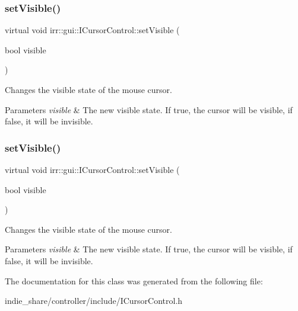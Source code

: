 \subsubsection{\texorpdfstring{set\+Visible()}{setVisible()}\hspace{0.1cm}{\footnotesize\ttfamily [1/2]}}
{\footnotesize\ttfamily virtual void irr\+::gui\+::\+I\+Cursor\+Control\+::set\+Visible (\begin{DoxyParamCaption}\item[{bool}]{visible }\end{DoxyParamCaption})\hspace{0.3cm}{\ttfamily [pure virtual]}}



Changes the visible state of the mouse cursor. 


\begin{DoxyParams}{Parameters}
{\em visible} & The new visible state. If true, the cursor will be visible, if false, it will be invisible. \\
\hline
\end{DoxyParams}
\mbox{\label{classirr_1_1gui_1_1ICursorControl_aceb41d68494e2b2076fbc6949b254c74}} 
\subsubsection{\texorpdfstring{set\+Visible()}{setVisible()}\hspace{0.1cm}{\footnotesize\ttfamily [2/2]}}
{\footnotesize\ttfamily virtual void irr\+::gui\+::\+I\+Cursor\+Control\+::set\+Visible (\begin{DoxyParamCaption}\item[{bool}]{visible }\end{DoxyParamCaption})\hspace{0.3cm}{\ttfamily [pure virtual]}}



Changes the visible state of the mouse cursor. 


\begin{DoxyParams}{Parameters}
{\em visible} & The new visible state. If true, the cursor will be visible, if false, it will be invisible. \\
\hline
\end{DoxyParams}


The documentation for this class was generated from the following file\+:\begin{DoxyCompactItemize}
\item 
indie\+\_\+share/controller/include/I\+Cursor\+Control.\+h\end{DoxyCompactItemize}
